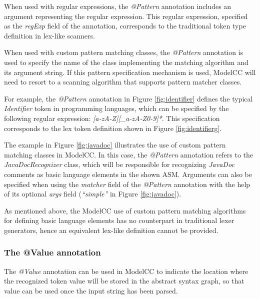 \documentclass[a4paper,twoside,onecolumn]{article}
\newcommand{\an}[1]{\emph{#1}} %
\begin{document}
When used with regular expressions, the \an{@Pattern} annotation includes an argument representing the regular expression.
This regular expression, specified as the \emph{regExp} field of the annotation, corresponds to the traditional token type definition in lex-like scanners.

When used with custom pattern matching classes, the \an{@Pattern} annotation is used to specify the name of the class implementing the matching algorithm and its argument string.
If this pattern specification mechanism is used, ModelCC will need to resort to a scanning algorithm that supports pattern matcher classes.

For example, the \an{@Pattern} annotation in Figure \ref{fig:identifier} defines the typical \emph{Identifier} token in programming languages, which can be specified by the following regular expression: \emph{[a-zA-Z][\_a-zA-Z0-9]*}.
This specification corresponds to the lex token definition shown in Figure \ref{fig:identifierg}.

The example in Figure \ref{fig:javadoc} illustrates the use of custom pattern matching classes in ModelCC.
In this case, the \an{@Pattern} annotation refers to the \emph{JavaDocRecognizer} class, which will be responsible for recognizing \emph{JavaDoc} comments as basic language elements in the shown ASM.
Arguments can also be specified when using the \emph{matcher} field of the \an{@Pattern} annotation with the help of its optional \emph{args} field (\emph{``simple''} in Figure \ref{fig:javadoc}).

As mentioned above, the ModelCC use of custom pattern matching algorithms for defining basic language elements has no counterpart in traditional lexer generators, hence an equivalent lex-like definition cannot be provided.

\subsubsection{The @Value annotation}

The \an{@Value} annotation can be used in ModelCC to indicate the location where the recognized token value will be stored in the abstract syntax graph, so that value can be used once the input string has been parsed.
\end{document}
